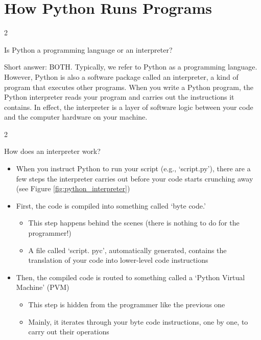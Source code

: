 \documentclass[a4paper,11pt]{book}
\newcommand{\question}[1]{%
    \begin{tcolorbox}[colback=comp_c!10,colframe=comp_c,sidebyside align=top,width=\linewidth,before skip=1ex]
        #1
    \end{tcolorbox}
    \switchcolumn%
}
\newcommand{\note}[1]{%
    \begin{tcolorbox}[colback=white!0,colframe=white!10,width=\linewidth,before skip=1ex]
        #1
    \end{tcolorbox}
}
\begin{document}
\section{How Python Runs Programs}

\begin{paracol}{2}
	\question{Is Python a programming language or an interpreter?}
	\note{Short answer: BOTH. Typically, we refer to Python as a programming language. However, Python is also a software package called an interpreter, a kind of program that executes other programs. When you write a Python program, the Python interpreter reads your program and carries out the instructions it contains. In effect, the interpreter is a layer of software logic between your code and the computer hardware on your machine.
	}
\end{paracol}	

\begin{paracol}{2}
	\question{\raggedright How does an interpreter work?}
	\note{
	\begin{itemize}
		\item When you instruct Python to run your script (e.g., `script.py'), there are a few steps the interpreter carries out before your code starts crunching away (see Figure \ref{fig:python_interpreter})
		\item First, the code is compiled into something called `byte code.'
		\begin{itemize}
			\item This step happens behind the scenes (there is nothing to do for the programmer!)
    			\item A file called `script. pyc', automatically generated, contains the translation of your code into lower-level code instructions
		\end{itemize}
		\item Then, the compiled code is routed to something called a `Python Virtual Machine' (PVM)
		\begin{itemize}
			\item This step is hidden from the programmer like the previous one
			\item Mainly, it iterates through your byte code instructions, one by one, to carry out their operations
		\end{itemize}
	\end{itemize}
	}
\end{paracol}
\end{document}
